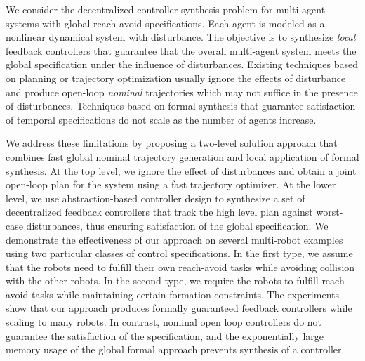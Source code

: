 
We consider the decentralized controller synthesis problem for multi-agent systems with global reach-avoid specifications.
Each agent is modeled as a nonlinear dynamical system with disturbance. The objective is to synthesize \emph{local} feedback controllers that guarantee that the overall multi-agent system meets the global specification under the influence of disturbances.
%
Existing techniques based on planning or trajectory optimization usually ignore the effects of disturbance and produce open-loop
\emph{nominal} trajectories which may not suffice in the presence of disturbances.
Techniques based on formal synthesis that guarantee satisfaction of temporal specifications do not scale as the number of agents increase.

We address these limitations by proposing a two-level solution approach that combines fast global nominal trajectory generation and local application of formal synthesis.
At the top level, we ignore the effect of disturbances and obtain a joint open-loop plan for the system using a fast trajectory optimizer.
At the lower level, we use abstraction-based controller design to synthesize a set of decentralized feedback controllers 
that track the high level plan against worst-case disturbances, thus ensuring satisfaction of the global specification.
We demonstrate the effectiveness of our approach on several multi-robot examples using two particular classes of control specifications.
In the first type, we assume that the robots need to fulfill their own reach-avoid tasks while avoiding collision with the other robots.
In the second type, we require the robots to fulfill reach-avoid tasks while maintaining certain formation constraints.
The experiments show that our approach produces formally guaranteed feedback controllers while scaling to many robots.
In contrast, nominal open loop controllers do not guarantee the satisfaction of the specification, and the exponentially large memory usage of the global formal approach prevents synthesis of a controller.
